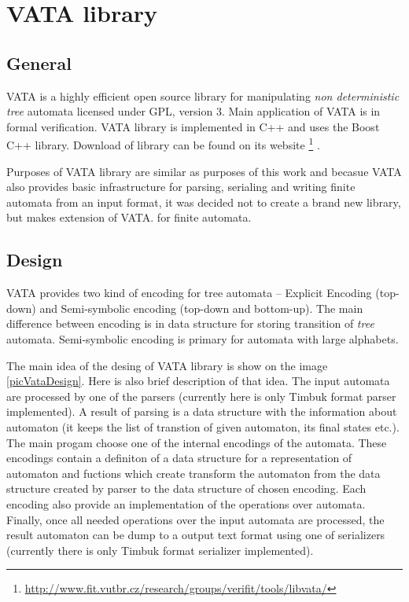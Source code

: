 \section{VATA library}
\label{VATA}
\subsection{General}
VATA is a highly efficient open source library for manipulating \emph{non deterministic tree} automata licensed under GPL, version 3. 
Main application of VATA is in formal verification.
VATA library is implemented in C++ and uses the Boost C++ library. Download of library can be found on its website 
\footnote{\url{http://www.fit.vutbr.cz/research/groups/verifit/tools/libvata/}} \cite{libvata}.  

Purposes of VATA library are similar as purposes of this work and becasue VATA also provides basic infrastructure for 
parsing, serialing and writing finite automata from an input format, 
it was decided not to create a brand new library, but makes extension of VATA.
for finite automata.

\subsection{Design}
\label{sectionDesignVata}
VATA provides two kind of encoding for tree automata -- Explicit Encoding (top-down) and Semi-symbolic encoding (top-down and bottom-up). The main difference
between encoding is
in data structure for storing transition of \emph{tree} automata. Semi-symbolic encoding is primary for automata with large alphabets. 

The main idea of the desing of VATA library is show on the image \ref{picVataDesign}. Here is also brief description of that idea. 
The input automata are processed by one of the parsers (currently
here is only Timbuk format parser implemented). A result of parsing is a data structure with the information about automaton (it keeps the list
of transtion of given automaton, its final states etc.). The main progam choose one of the internal encodings of the automata. These encodings
contain a definiton of a data structure for a representation of automaton and fuctions which create transform the automaton from the data structure
created by parser to the data structure of chosen encoding. Each encoding also provide
an implementation of the operations over automata. 
Finally, once all needed operations over the input automata are processed, the result automaton can be dump to a output text format using one of serializers 
(currently there is only Timbuk format serializer implemented).

